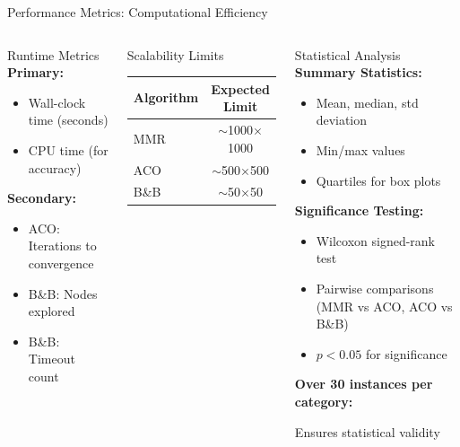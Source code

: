 \documentclass[aspectratio=43,8pt]{beamer}
\begin{document}
\begin{frame}{Performance Metrics: Computational Efficiency}
\begin{columns}[t]
\begin{block}{Runtime Metrics}
\textbf{Primary:}
\begin{itemize}
    \item Wall-clock time (seconds)
    \item CPU time (for accuracy)
\end{itemize}

\vspace{0.2cm}
\textbf{Secondary:}
\begin{itemize}
    \item ACO: Iterations to convergence
    \item B\&B: Nodes explored
    \item B\&B: Timeout count
\end{itemize}
\end{block}

\begin{alertblock}{Scalability Limits}
\begin{tabular}{lc}
\toprule
\textbf{Algorithm} & \textbf{Expected Limit} \\
\midrule
MMR & $\sim$1000$\times$1000 \\
ACO & $\sim$500$\times$500 \\
B\&B & $\sim$50$\times$50 \\
\bottomrule
\end{tabular}
\end{alertblock}

\begin{exampleblock}{Statistical Analysis}
\textbf{Summary Statistics:}
\begin{itemize}
    \item Mean, median, std deviation
    \item Min/max values
    \item Quartiles for box plots
\end{itemize}

\vspace{0.2cm}
\textbf{Significance Testing:}
\begin{itemize}
    \item Wilcoxon signed-rank test
    \item Pairwise comparisons (MMR vs ACO, ACO vs B\&B)
    \item $p < 0.05$ for significance
\end{itemize}

\vspace{0.2cm}
\textbf{Over 30 instances per category:}

Ensures statistical validity
\end{exampleblock}
\end{columns}
\end{frame}
\end{document}
